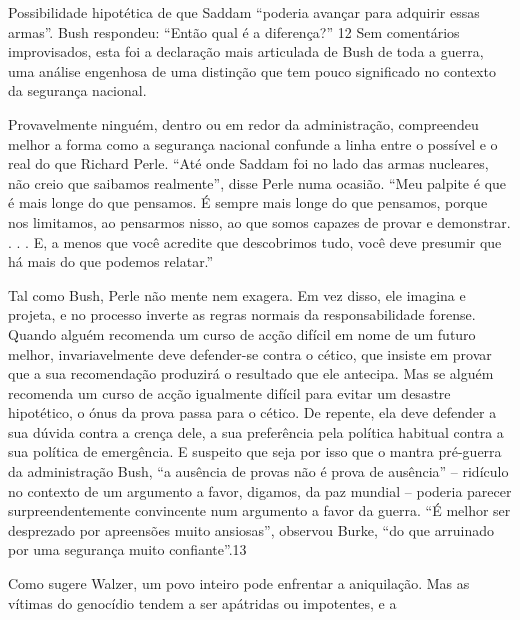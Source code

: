 \par 
Possibilidade hipotética de que Saddam “poderia avançar para adquirir essas armas”. Bush respondeu: “Então qual é a diferença?” {\color{blue}12} Sem comentários improvisados, esta foi a declaração mais articulada de Bush de toda a guerra, uma análise engenhosa de uma distinção que tem pouco significado no contexto da segurança nacional.
 \par 
Provavelmente ninguém, dentro ou em redor da administração, compreendeu melhor a forma como a segurança nacional confunde a linha entre o possível e o real do que Richard Perle. “Até onde Saddam foi no lado das armas nucleares, não creio que saibamos realmente”, disse Perle numa ocasião. “Meu palpite é que é mais longe do que pensamos. É sempre mais longe do que pensamos, porque nos limitamos, ao pensarmos nisso, ao que somos capazes de provar e demonstrar. . . . E, a menos que você acredite que descobrimos tudo, você deve presumir que há mais do que podemos relatar.”
 \par 
Tal como Bush, Perle não mente nem exagera. Em vez disso, ele imagina e projeta, e no processo inverte as regras normais da responsabilidade forense. Quando alguém recomenda um curso de acção difícil em nome de um futuro melhor, invariavelmente deve defender-se contra o cético, que insiste em provar que a sua recomendação produzirá o resultado que ele antecipa. Mas se alguém recomenda um curso de acção igualmente difícil para evitar um desastre hipotético, o ónus da prova passa para o cético. De repente, ela deve defender a sua dúvida contra a crença dele, a sua preferência pela política habitual contra a sua política de emergência. E suspeito que seja por isso que o mantra pré-guerra da administração Bush, “a ausência de provas não é prova de ausência” – ridículo no contexto de um argumento a favor, digamos, da paz mundial – poderia parecer surpreendentemente convincente num argumento a favor da guerra. “É melhor ser desprezado por apreensões muito ansiosas”, observou Burke, “do que arruinado por uma segurança muito confiante”.{\color{blue}13}
 \par 
Como sugere Walzer, um povo inteiro pode enfrentar a aniquilação. Mas as vítimas do genocídio tendem a ser apátridas ou impotentes, e a
 \par 
